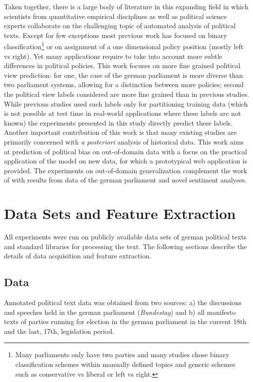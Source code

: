 \documentclass[runningheads,a4paper]{llncs}
\begin{document}
Taken together, there is a large body of literature in this expanding field in which scientists from quantitative empirical disciplines as well as political science experts collaborate on the challenging topic of automated analysis of political texts. Except for few exceptions most previous work has focused on binary classification\footnote{Many parliaments only have two parties and many studies chose binary classification schemes within manually defined topics and generic schemes such as conservative vs liberal or left vs right.} or on assignment of a one dimensional policy position (mostly left vs right). Yet many applications require to take into account more subtle differences in political policies. This work focuses on more fine grained political view prediction: for one, the case of the german parliament is more diverse than two parliament systems, allowing for a distinction between more policies; second the political view labels considered are more fine grained than in previous studies. While previous studies used such labels only for partitioning training data \cite{Slapin08ascaling} (which is not possible at test time in real-world applications where these labels are not known) the experiments presented in this study directly predict these labels. Another important contribution of this work is that many existing studies are primarily concerned with {\em a posteriori} analysis of historical data. This work aims at prediction of political bias on out-of-domain data with a focus on the practical application of the model on new data, for which a prototypical web application is provided. The experiments on out-of-domain generalization complement the work of \cite{Yu2008, Hirst2014} with results from data of the german parliament and novel sentiment analyses. 

\section{Data Sets and Feature Extraction}\label{sec:data}
%
All experiments were run on publicly available data sets of german political texts and standard libraries for processing the text. The following sections describe the details of data acquisition and feature extraction. 

\subsection{Data}
Annotated political text data was obtained from two sources: a) the discussions and speeches held in the german parliament ({\em Bundestag}) and b) all manifesto texts of parties running for election in the german parliament in the current 18th and the last, 17th, legislation period.
\end{document}
